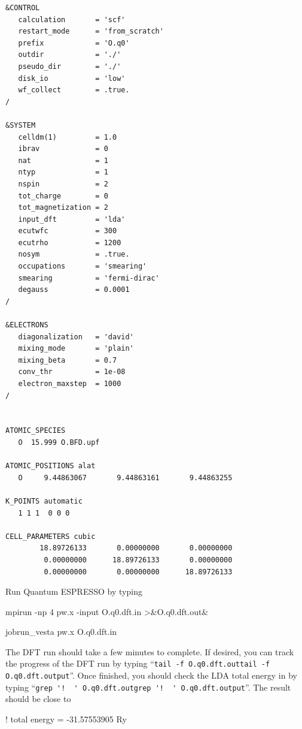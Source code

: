 \begin{lstlisting}[caption={Quantum ESPRESSO input file for the neutral oxygen atom (\texttt{O.q0.dft.in})\label{lst:O_q0_dft}}]
&CONTROL
   calculation       = 'scf'
   restart_mode      = 'from_scratch'
   prefix            = 'O.q0'
   outdir            = './'
   pseudo_dir        = './'
   disk_io           = 'low'
   wf_collect        = .true.
/

&SYSTEM
   celldm(1)         = 1.0
   ibrav             = 0
   nat               = 1
   ntyp              = 1
   nspin             = 2
   tot_charge        = 0
   tot_magnetization = 2
   input_dft         = 'lda'
   ecutwfc           = 300
   ecutrho           = 1200
   nosym             = .true.
   occupations       = 'smearing'
   smearing          = 'fermi-dirac'
   degauss           = 0.0001
/

&ELECTRONS
   diagonalization   = 'david'
   mixing_mode       = 'plain'
   mixing_beta       = 0.7
   conv_thr          = 1e-08
   electron_maxstep  = 1000
/


ATOMIC_SPECIES 
   O  15.999 O.BFD.upf

ATOMIC_POSITIONS alat
   O     9.44863067       9.44863161       9.44863255

K_POINTS automatic
   1 1 1  0 0 0 

CELL_PARAMETERS cubic
        18.89726133       0.00000000       0.00000000 
         0.00000000      18.89726133       0.00000000 
         0.00000000       0.00000000      18.89726133
\end{lstlisting}

Run Quantum ESPRESSO by typing 
\ifws
\begin{shade}
mpirun -np 4 pw.x -input O.q0.dft.in >&O.q0.dft.out&
\end{shade}
\else
\begin{shade}
jobrun_vesta pw.x O.q0.dft.in
\end{shade}
\fi

The DFT run should take a few minutes to complete.  If desired, you can track the progress of the DFT run by typing ``\ifws\verb|tail -f O.q0.dft.out|\else\verb|tail -f O.q0.dft.output|\fi''. Once finished, you should check the LDA total energy in \texttt{} by typing ``\ifws\verb|grep '!  ' O.q0.dft.out|\else\verb|grep '!  ' O.q0.dft.output|\fi''.  The result should be close to
\begin{shade}
!    total energy              =     -31.57553905 Ry
\end{shade} 



